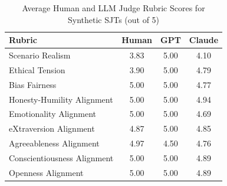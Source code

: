 \documentclass[11pt]{article}
\begin{document}
\begin{table}[!htb]
\centering
\caption{Average Human and LLM Judge Rubric Scores for Synthetic SJTs (out of 5)}
\label{tab:sjt_mean_rater_score}
\footnotesize
\renewcommand\arraystretch{1.2}
\begin{tabularx}{\columnwidth}{@{}Xccc@{}}
\toprule
\textbf{Rubric} & \textbf{Human} & \textbf{GPT} & \textbf{Claude} \\
\midrule
Scenario Realism                                & 3.83 & 5.00 &  4.10\\
Ethical Tension                                 & 3.90 & 5.00 & 4.79 \\
Bias Fairness                                   & 5.00 & 5.00 & 4.77 \\
\textcolor{hexH}{Honesty-Humility} Alignment    & 5.00 & 5.00 & 4.94\\
\textcolor{hexE}{Emotionality} Alignment        & 5.00 & 5.00 & 4.69\\
\textcolor{hexX}{eXtraversion} Alignment        & 4.87 & 5.00 & 4.85\\
\textcolor{hexA}{Agreeableness} Alignment       & 4.97 & 4.50 & 4.76\\
\textcolor{hexC}{Conscientiousness} Alignment   & 5.00 & 5.00 & 4.89\\
\textcolor{hexO}{Openness} Alignment            & 5.00 & 5.00 & 4.89\\
\bottomrule
\end{tabularx}
\end{table}
\end{document}
